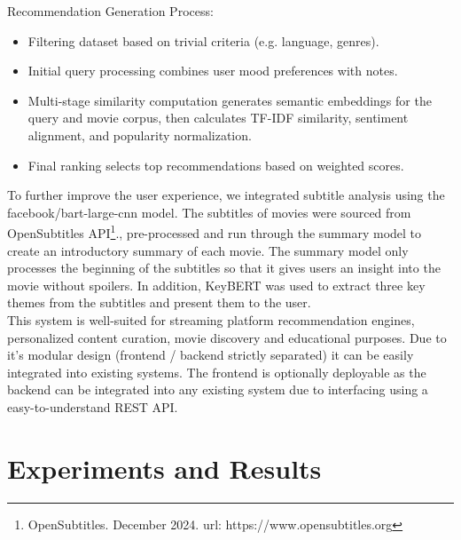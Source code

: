 \documentclass[12pt,a4paper]{article}
\begin{document}
\noindent Recommendation Generation Process:
\begin{itemize}
  \item Filtering dataset based on trivial criteria (e.g. language, genres).
  \item Initial query processing combines user mood preferences with notes.
  \item Multi-stage similarity computation generates semantic embeddings for the query and movie corpus, then calculates TF-IDF similarity, sentiment alignment, and popularity normalization.
  \item Final ranking selects top recommendations based on weighted scores.
\end{itemize}

\noindent To further improve the user experience, we integrated subtitle analysis using the facebook/bart-large-cnn model.
The subtitles of movies were sourced from OpenSubtitles API\footnote{\label{OpenSubtitles}OpenSubtitles. December 2024. url: https://www.opensubtitles.org}., pre-processed and run through the summary model to create an introductory summary of each movie.
The summary model only processes the beginning of the subtitles so that it gives users an insight into the movie without spoilers.
In addition, KeyBERT was used to extract three key themes from the subtitles and present them to the user.
\newline \\
\noindent This system is well-suited for streaming platform recommendation engines, personalized content curation, movie discovery and educational purposes.
Due to it's modular design (frontend / backend strictly separated) it can be easily integrated into existing systems.
The frontend is optionally deployable as the backend can be integrated into any existing system due to interfacing
using a easy-to-understand REST API.

\section{Experiments and Results}
\end{document}
